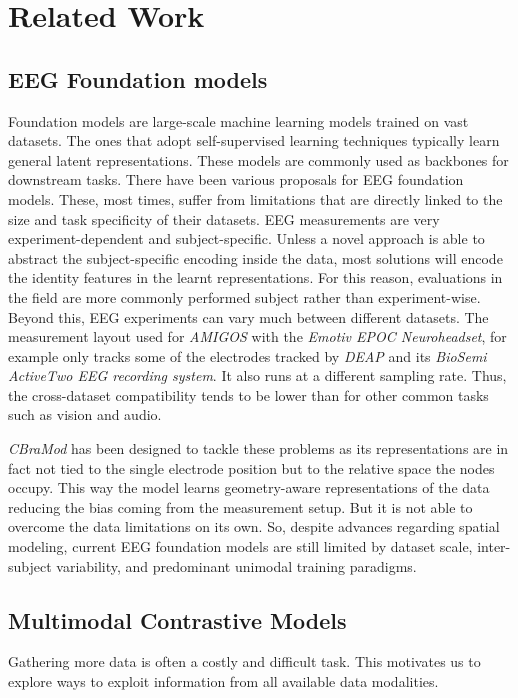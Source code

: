


\section{Related Work}

\subsection{EEG Foundation models}
Foundation models are large-scale machine learning models trained on vast datasets.
The ones that adopt self-supervised learning techniques typically learn general latent representations.
These models are commonly used as backbones for downstream tasks.
There have been various proposals for EEG foundation models.
These, most times, suffer from limitations that are directly linked to the size and task specificity of their datasets.
EEG measurements are very experiment-dependent and subject-specific.
Unless a novel approach is able to abstract the subject-specific encoding inside the data, most solutions will encode the identity features in the learnt representations.
For this reason, evaluations in the field are more commonly performed subject rather than experiment-wise.
Beyond this, EEG experiments can vary much between different datasets.
The measurement layout used for \textit{AMIGOS}\cite{8554112} with the \textit{Emotiv EPOC Neuroheadset}, for example only tracks some
of the electrodes tracked by \textit{DEAP}\cite{5871728} and its \textit{BioSemi ActiveTwo EEG recording system}.
It also runs at a different sampling rate.
Thus, the cross-dataset compatibility tends to be lower than for other common tasks such as vision and audio.

\textit{CBraMod} has been designed to tackle these problems as its representations are in fact not tied to the single
electrode position but to the relative space the nodes occupy.
This way the model learns geometry-aware representations of the data reducing the bias coming from the measurement setup.
But it is not able to overcome the data limitations on its own.
So, despite advances regarding spatial modeling, current EEG foundation models are still limited by dataset scale,
inter-subject variability, and predominant unimodal training paradigms.

\subsection{Multimodal Contrastive Models}
Gathering more data is often a costly and difficult task.
This motivates us to explore ways to exploit information from all available data modalities.

